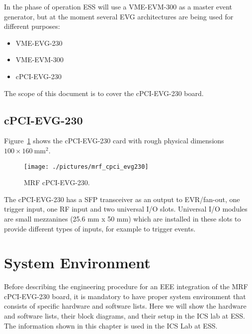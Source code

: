 \documentclass[11pt
  , a4paper
  , article
  , oneside
  , showtrims
]{memoir}
\begin{document}
In the phase of operation ESS will use a VME-EVM-300 as a master event generator, but at the moment several EVG architectures are being used for different purposes:
\begin{itemize}
\item VME-EVG-230
\item VME-EVM-300
\item cPCI-EVG-230
\end{itemize}

The scope of this document is to cover the cPCI-EVG-230 board.


\section{cPCI-EVG-230}
Figure~\ref{fig:cpci-evg230} shows the cPCI-EVG-230 card with rough physical dimensions $100\times 160~\mathrm{mm}{}^2$.

\begin{figure}[!htb]
  \centering
  \texttt{[image: ./pictures/mrf\_cpci\_evg230]}
  \caption{
    MRF cPCI-EVG-230.
  }
  \label{fig:cpci-evg230}   
\end{figure}


The cPCI-EVG-230  has a SFP transceiver as an output to EVR/fan-out, one trigger input, one RF input and two universal I/O slots. Universal I/O modules are small mezzanines (25.6 mm x 50 mm) which are installed in these slots to provide different types of inputs, for example to trigger events.


\clearpage

\chapter{System Environment}
Before describing the engineering procedure for an EEE integration of the MRF cPCI-EVG-230 board, it is mandatory to have proper system environment that consists of specific hardware and software lists. Here we will show the hardware and software lists, their block diagrams, and their setup in the ICS lab at ESS. The information shown in this chapter is used in the ICS Lab at ESS.
\end{document}
